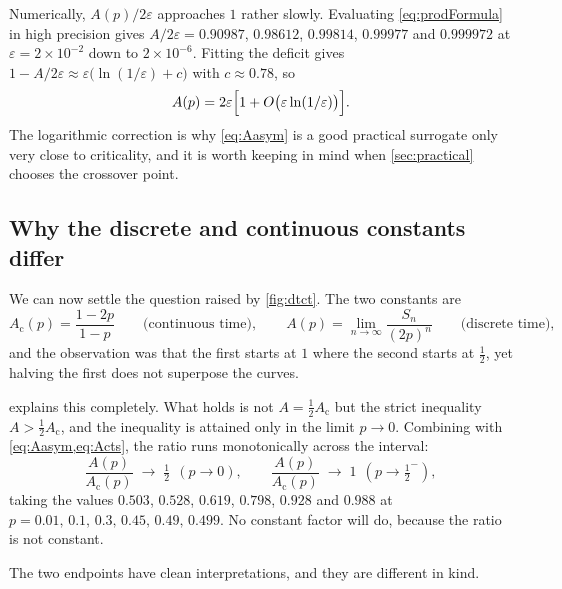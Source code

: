 \begin{remark}
\label{rem:rate}
Numerically, $A(p)/2\varepsilon$ approaches $1$ rather slowly. Evaluating
\cref{eq:prodFormula} in high precision gives $A/2\varepsilon = 0.90987$, $0.98612$,
$0.99814$, $0.99977$ and $0.999972$ at $\varepsilon = 2\times10^{-2}$ down to
$2\times10^{-6}$. Fitting the deficit gives
$1 - A/2\varepsilon \approx \varepsilon\bigl(\ln(1/\varepsilon)+c\bigr)$ with
$c\approx0.78$, so
\begin{equation*}
A(p) = 2\varepsilon\Bigl[1+O\bigl(\varepsilon\ln(1/\varepsilon)\bigr)\Bigr].
\end{equation*}
The logarithmic correction is why \cref{eq:Aasym} is a good practical surrogate only
very close to criticality, and it is worth keeping in mind when \cref{sec:practical}
chooses the crossover point.
\end{remark}

\subsection{Why the discrete and continuous constants differ}
\label{sec:compare}

We can now settle the question raised by \cref{fig:dtct}. The two constants are
\begin{equation*}
A_{\text{c}}(p) = \frac{1-2p}{1-p}
\qquad\text{(continuous time)},
\qquad
A(p) = \lim_{n\to\infty}\frac{S_n}{(2p)^n}
\qquad\text{(discrete time)},
\end{equation*}
and the observation was that the first starts at $1$ where the second starts at
$\tfrac12$, yet halving the first does not superpose the curves.

 explains this completely. What holds is not
$A = \tfrac12 A_{\text{c}}$ but the strict inequality $A > \tfrac12 A_{\text{c}}$, and the
inequality is attained only in the limit $p\to0$. Combining with
\cref{eq:Aasym,eq:Acts}, the ratio runs monotonically across the interval:
\begin{equation}
\label{eq:ratiolimits}
\frac{A(p)}{A_{\text{c}}(p)} \;\longrightarrow\; \tfrac12 \ \ (p\to0),
\qquad
\frac{A(p)}{A_{\text{c}}(p)} \;\longrightarrow\; 1 \ \ (p\to\tfrac12^-),
\end{equation}
taking the values $0.503$, $0.528$, $0.619$, $0.798$, $0.928$ and $0.988$ at
$p = 0.01,\,0.1,\,0.3,\,0.45,\,0.49,\,0.499$. No constant factor will do, because the
ratio is not constant.

The two endpoints have clean interpretations, and they are different in kind.


